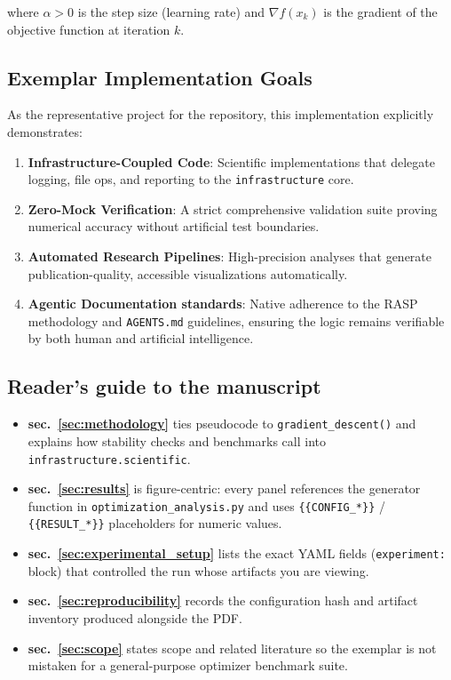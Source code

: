 \documentclass[
]{article}
\providecommand{\tightlist}{%
  \setlength{\itemsep}{0pt}\setlength{\parskip}{0pt}}
\begin{document}
where \(\alpha > 0\) is the step size (learning rate) and
\(\nabla f(x_k)\) is the gradient of the objective function at iteration
\(k\).

\subsection{Exemplar Implementation
Goals}\label{exemplar-implementation-goals}

As the representative project for the repository, this implementation
explicitly demonstrates:

\begin{enumerate}
\def\labelenumi{\arabic{enumi}.}
\tightlist
\item
  \textbf{Infrastructure-Coupled Code}: Scientific implementations that
  delegate logging, file ops, and reporting to the
  \texttt{infrastructure} core.
\item
  \textbf{Zero-Mock Verification}: A strict comprehensive validation
  suite proving numerical accuracy without artificial test boundaries.
\item
  \textbf{Automated Research Pipelines}: High-precision analyses that
  generate publication-quality, accessible visualizations automatically.
\item
  \textbf{Agentic Documentation standards}: Native adherence to the RASP
  methodology and \texttt{AGENTS.md} guidelines, ensuring the logic
  remains verifiable by both human and artificial intelligence.
\end{enumerate}

\subsection{Reader's guide to the
manuscript}\label{readers-guide-to-the-manuscript}

\begin{itemize}
\tightlist
\item
  \textbf{sec.~\ref{sec:methodology}} ties pseudocode to
  \texttt{gradient\_descent()} and explains how stability checks and
  benchmarks call into \texttt{infrastructure.scientific}.
\item
  \textbf{sec.~\ref{sec:results}} is figure-centric: every panel
  references the generator function in
  \texttt{optimization\_analysis.py} and uses \texttt{\{\{CONFIG\_*\}\}}
  / \texttt{\{\{RESULT\_*\}\}} placeholders for numeric values.
\item
  \textbf{sec.~\ref{sec:experimental_setup}} lists the exact YAML fields
  (\texttt{experiment:} block) that controlled the run whose artifacts
  you are viewing.
\item
  \textbf{sec.~\ref{sec:reproducibility}} records the configuration hash
  and artifact inventory produced alongside the PDF.
\item
  \textbf{sec.~\ref{sec:scope}} states scope and related literature so
  the exemplar is not mistaken for a general-purpose optimizer benchmark
  suite.
\end{itemize}
\end{document}
